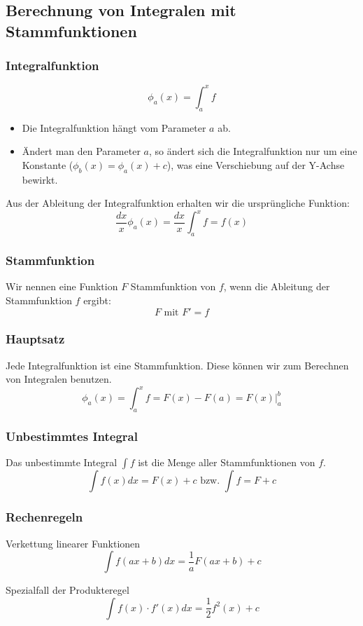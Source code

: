 \subsection{Berechnung von Integralen mit Stammfunktionen}
\subsubsection{Integralfunktion}
\[ \phi_a(x) = \int_a^x f \]
\begin{itemize}
  \item Die Integralfunktion hängt vom Parameter $a$ ab.
  \item Ändert man den Parameter $a$, so ändert sich die
  Integralfunktion nur um eine Konstante ($\phi_b(x) = \phi_a(x) + c$),
  was eine Verschiebung auf der Y-Achse bewirkt.
\end{itemize}

Aus der Ableitung der Integralfunktion erhalten wir die ursprüngliche Funktion:
\[ \frac{dx}{x} \phi_a(x) = \frac{dx}{x} \int_a^x f = f(x) \]

\subsubsection{Stammfunktion}
Wir nennen eine Funktion $F$ Stammfunktion von $f$, wenn die Ableitung
der Stammfunktion $f$ ergibt:
\[F \text{ mit } F' = f\]
\subsubsection{Hauptsatz}
Jede Integralfunktion ist eine Stammfunktion. Diese können wir zum
Berechnen von Integralen benutzen.
\[\phi_a(x) = \int_a^x f  = F(x) - F(a) = F(x)|^b_a\]

\subsubsection{Unbestimmtes Integral}
Das unbestimmte Integral $\int f$ ist die Menge aller Stammfunktionen
von $f$.
\[ \int f(x) dx = F(x) + c \text{ bzw. } \int f = F + c\]

\subsubsection{Rechenregeln}
Verkettung linearer Funktionen
\[ \int f(ax+b)dx = \frac{1}{a}F(ax+b) + c \]

Spezialfall der Produkteregel
\[ \int f(x) \cdot f'(x) dx = \frac{1}{2}f^2(x) + c \]

